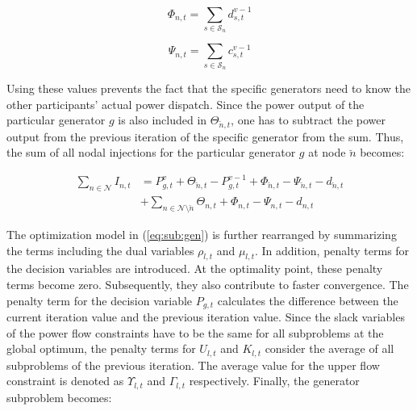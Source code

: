 \begin{equation}
	\Phi_{n,t} = \sum_{s\in\mathcal{S}_n}d_{s,t}^{v-1}
\end{equation}

\begin{equation}
	\Psi_{n,t} = \sum_{s\in\mathcal{S}_n}c_{s,t}^{v-1}
\end{equation}
 
 Using these values prevents the fact that the specific generators need to know the other participants' actual power dispatch. Since the power output of the particular generator $g$ is also included in $\Theta_{\breve{n},t}$, one has to subtract the power output from the previous iteration of the specific generator from the sum. Thus, the sum of all nodal injections for the particular generator $g$ at node $\breve{n}$ becomes: 

 \begin{align}
 	\sum_{n \in \mathcal{N}} I_{n,t} &= P_{g,t}^v + \Theta_{\breve{n},t} - P_{g,t}^{v-1} + \Phi_{\breve{n},t} - \Psi_{\breve{n},t} - d_{\breve{n},t} \\
 	& + \sum_{n \in \mathcal{N} \setminus \breve{n}} \Theta_{n,t} + \Phi_{n,t} - \Psi_{n,t} - d_{n,t} \nonumber
 \end{align}
 
 The optimization model in (\ref{eq:sub:gen}) is further rearranged by summarizing the terms including the dual variables $\rho_{l,t}$ and $\mu_{l,t}$. In addition, penalty terms for the decision variables are introduced. At the optimality point, these penalty terms become zero. Subsequently, they also contribute to faster convergence. The penalty term for the decision variable $P_{g,t}$ calculates the difference between the current iteration value and the previous iteration value. Since the slack variables of the power flow constraints have to be the same for all subproblems at the global optimum, the penalty terms for $U_{l,t}$ and $K_{l,t}$ consider the average of all subproblems of the previous iteration. The average value for the upper flow constraint is denoted as $\Upsilon_{l,t}$ and $\Gamma_{l,t}$ respectively. Finally, the generator subproblem becomes:
 
